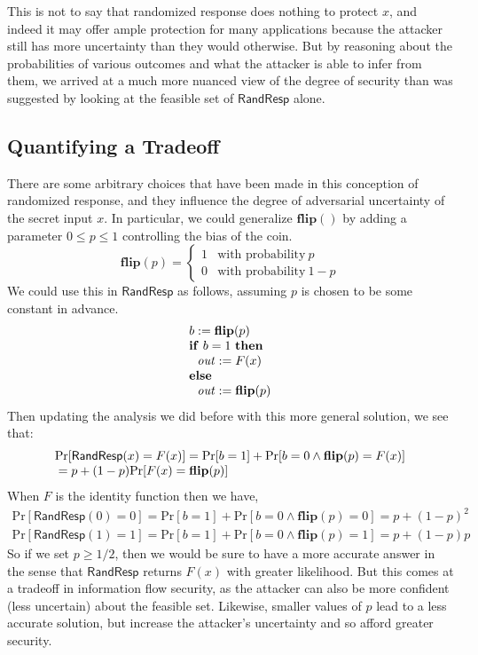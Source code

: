 \documentclass[11pt]{article}
\newcommand{\pr}{\mathrm{Pr}}
\newcommand{\flip}{\mathbf{flip}}
\begin{document}
This is not to say that randomized response does nothing to protect $x$, and
indeed it may offer ample protection for many applications because the attacker
still has more uncertainty than they would otherwise. But by reasoning about the
probabilities of various outcomes and what the attacker is able to infer from
them, we arrived at a much more nuanced view of the degree of security than was
suggested by looking at the feasible set of $\mathsf{RandResp}$ alone.

\subsection{Quantifying a Tradeoff}

There are some arbitrary choices that have been made in this conception
of randomized response, and they influence the degree of adversarial
uncertainty of the secret input $x$. In particular, we could generalize
$\flip()$ by adding a parameter $0 \le p \le 1$ controlling the bias of
the coin.
\[
\flip(p) =
\left\{
\begin{array}{ll}
%
1 & \mbox{with probability}\ p \\
0 & \mbox{with probability}\ 1 - p
\end{array}
\right.
\]
We could use this in $\mathsf{RandResp}$ as follows, assuming $p$ is
chosen to be some constant in advance.
\[
\begin{array}{l}
%
b := \flip(p) \\
\mathbf{if}\ b = 1\ \mathbf{then} \\
\ \ \mi{out} := F(x) \\
\mathbf{else} \\
\ \ \mi{out} := \flip(p)
\end{array}
\]
Then updating the analysis we did before with this more general
solution, we see that:
\[
\begin{array}{l}
  \pr[\mathsf{RandResp}(x) = F(x)] = \pr[b = 1] + \pr[b = 0 \land \flip(p) = F(x)] \\
  \null = p + (1-p)\pr[F(x)=\flip(p)]
\end{array}
\]
When $F$ is the identity function then we have,
\[
  \begin{array}{l}
\pr[\mathsf{RandResp}(0) = 0] = \pr[b = 1] + \pr[b = 0 \land \flip(p) = 0] = p + (1-p)^2 \\
\pr[\mathsf{RandResp}(1) = 1] = \pr[b = 1] + \pr[b = 0 \land \flip(p) = 1] = p + (1-p)p
  \end{array}
\]
So if we set $p \ge 1/2$, then we would be sure to have a more accurate
answer in the sense that $\mathsf{RandResp}$ returns $F(x)$ with greater
likelihood. But this comes at a tradeoff in information flow security,
as the attacker can also be more confident (less uncertain) about the
feasible set. Likewise, smaller values of $p$ lead to a less accurate
solution, but increase the attacker's uncertainty and so afford greater
security.
\end{document}
